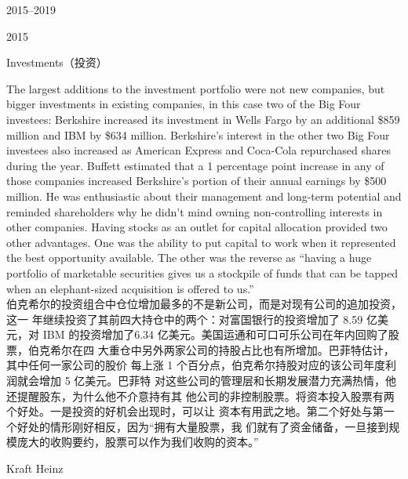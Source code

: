 \begin{chapter}{2015--2019}
\begin{section}{2015}
\begin{subsection}{Investments（投资）}
\begin{verseparallel}
  {
    The largest additions to the investment portfolio were not new companies,
    but bigger investments in existing companies, in this case two of the Big
    Four investees: Berkshire increased its investment in Wells Fargo by an
    additional \$859 million and IBM by \$634 million. Berkshire’s interest in
    the other two Big Four investees also increased as American Express and
    Coca-Cola repurchased shares during the year. Buffett estimated that a 1
    percentage point increase in any of those companies increased Berkshire’s
    portion of their annual earnings by \$500 million. He was enthusiastic about
    their management and long-term potential and reminded shareholders why he
    didn’t mind owning non-controlling interests in other companies. Having
    stocks as an outlet for capital allocation provided two other advantages.
    One was the ability to put capital to work when it represented the best
    opportunity available. The other was the reverse as ``having a huge
    portfolio of marketable securities gives us a stockpile of funds that can be
    tapped when an elephant-sized acquisition is offered to us.'' \\
  }
  {
    伯克希尔的投资组合中仓位增加最多的不是新公司，而是对现有公司的追加投资，这一
    年继续投资了其前四大持仓中的两个：对富国银行的投资增加了 8.59 亿美元，对 IBM
    的投资增加了6.34 亿美元。美国运通和可口可乐公司在年内回购了股票，伯克希尔在四
    大重仓中另外两家公司的持股占比也有所增加。巴菲特估计，其中任何一家公司的股价
    每上涨 1 个百分点，伯克希尔持股对应的该公司年度利润就会增加 5 亿美元。巴菲特
    对这些公司的管理层和长期发展潜力充满热情，他还提醒股东，为什么他不介意持有其
    他公司的非控制股票。将资本投入股票有两个好处。一是投资的好机会出现时，可以让
    资本有用武之地。第二个好处与第一个好处的情形刚好相反，因为“拥有大量股票，我
    们就有了资金储备，一旦接到规模庞大的收购要约，股票可以作为我们收购的资本。”
  }
\end{verseparallel}
\end{subsection}

\begin{subsection}{Kraft Heinz}


\end{subsection}
\end{section}
\end{chapter}
